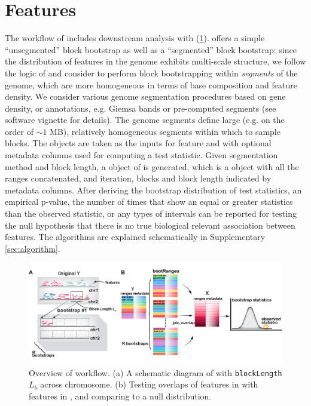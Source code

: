 \vspace*{-20pt}

\section{Features}
The workflow of \bootranges includes downstream analysis with
\plyranges (\cref{fig:framework}).
\bootranges offers a simple ``unsegmented'' block bootstrap as well as
a ``segmented'' block bootstrap:
since the distribution of features in the genome exhibits multi-scale
structure, we follow the logic of \citet{bickel2010subsampling} and consider to
perform block bootstrapping within \textit{segments} of the genome, which are
more homogeneous in terms of base composition and feature density.
We consider various genome segmentation procedures based on gene
density, or annotations, e.g. Giemsa bands or pre-computed segments
(see software vignette for details).
The genome segments define large (e.g. on the order of $\sim 1$ MB),
relatively homogeneous segments within which to sample blocks. 
The \granges objects are taken as the inputs for feature  and
 with optional metadata columns used for computing a test
statistic. Given segmentation method and block length, a \bootranges
object of  is generated, which is a \granges object with all
the ranges concatenated, and iteration, blocks and block length
indicated by metadata columns.  
After deriving the bootstrap distribution of test statistics, an
empirical p-value, the number of times that show an equal or greater
statistics than the observed statistic, or any types of intervals can
be reported for testing the null hypothesis that there is no true
biological relevant association between features.  
The \bootranges algorithms are explained schematically in
Supplementary \cref{sec:algorithm}.

\vspace{-0.3cm}
\begin{figure}[htbp]
\centering%
\setlength{\abovecaptionskip}{-0.05cm}
\includegraphics[scale=0.65]{Figures/bootRanges.jpg}
\caption{Overview of \bootranges workflow. (a) A schematic
  diagram of \bootranges with \texttt{blockLength} $L_b$ across chromosome.
  (b) Testing overlaps of features in  with features in
  , and comparing to a null distribution.} 
\label{fig:framework}
\vspace{-0.5cm}
\end{figure}

